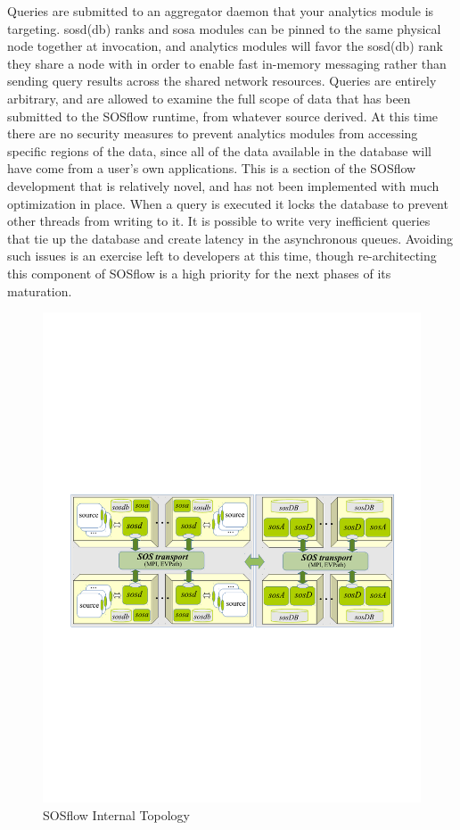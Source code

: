 Queries are submitted to an aggregator daemon that your analytics
module is targeting.
%
sosd(db) ranks and sosa modules can be pinned to the same physical
node together at invocation, and analytics modules will favor the
sosd(db) rank they share a node with in order to enable fast in-memory
messaging rather than sending query results across the shared network
resources.
%
Queries are entirely arbitrary, and are allowed to examine the full
scope of data that has been submitted to the SOSflow runtime, from
whatever source derived.
%
At this time there are no security measures to prevent analytics
modules from accessing specific regions of the data, since all of the
data available in the database will have come from a user's own
applications.
%
This is a section of the SOSflow development that is relatively novel,
and has not been implemented with much optimization in place.
%
When a query is executed it locks the database to prevent other
threads from writing to it.
%
It is possible to write very inefficient queries that tie up the
database and create latency in the asynchronous queues.
%
Avoiding such issues is an exercise left to developers at this time,
though re-architecting this component of SOSflow is a high priority
for the next phases of its maturation.

\begin{figure}[!t]
  \centering
  \includegraphics[width=5in]{images/sos.pdf}
  \caption{SOSflow Internal Topology}
  \label{fig_sim}
\end{figure}



